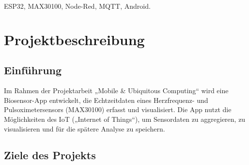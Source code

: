 \documentclass[conference,a4paper,flushend]{cs-techrep}
\begin{document}
\selectlanguage{\cstechrepLang}

\maketitle

\begin{abstract}
Pulse-Oximeter ist eine Android-Anwendung, die den Benutzern die Möglichkeit bietet, ihren Puls und ihre Sauerstoffsättigungswerte zu überwachen. Der Prozess beginnt mit einem \textbf{ESP32-Mikrocontroller, der mit einem MAX30100-Sensor ausgestattet ist}. Dieser sammelt Daten und sendet sie über USB an einen \textbf{PC oder Laptop mit Node-RED}. Node-RED ist für den Empfang, die Aggregation und die Visualisierung dieser Sensordaten zuständig. Die Daten werden dann an einen \textbf{MQTT-Broker} übertragen, der lokal gehostet wird. Schließlich abonniert eine \textbf{Smartphone-App} den MQTT-Broker, um die Daten zu empfangen, sie zu visualisieren und lokal mit SQLite zu speichern. 
\end{abstract}

\begin{IEEEkeywords}
 ESP32, MAX30100, Node-Red, MQTT, Android.
\end{IEEEkeywords}


\section{Projektbeschreibung}

\subsection{Einführung}

Im Rahmen der Projektarbeit „Mobile \& Ubiquitous Computing“ wird eine Biosensor-App entwickelt, die Echtzeitdaten eines Herzfrequenz- und Pulsoximetersensors (MAX30100) erfasst und visualisiert. Die App nutzt die Möglichkeiten des  IoT („Internet of Things“), um Sensordaten zu aggregieren, zu visualisieren und für die spätere Analyse zu speichern.

\subsection{Ziele des Projekts}
\end{document}
